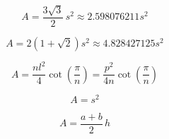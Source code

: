 \[\begin{equation} A = \frac{3 \sqrt{3}}{2} \, s^2 \approx 2.598076211 s^2 \end{equation}\]

\[\begin{equation} A = 2 \left( 1 + \sqrt{2} \right) s^2 \approx 4.828427125 s^2 \end{equation}\]

\[\begin{equation} A = \frac{n l^2 }{4} \cot \left( \frac{\pi}{n} \right) = \frac{p^2}{4n} \cot \left( \frac{\pi}{n} \right) \end{equation}\]

\[\begin{equation} A = s^2 \end{equation}\]

\[\begin{equation} A = \frac{a + b}{2} \, h \end{equation}\]

